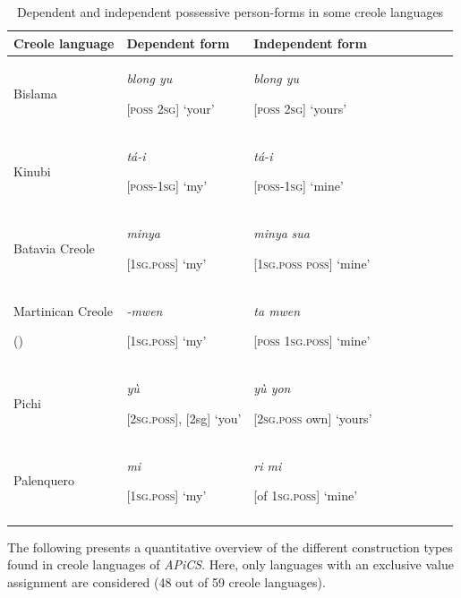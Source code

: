 \documentclass[output=paper]{langsci/langscibook}
\begin{document}
\begin{table}
\begin{tabularx}{\textwidth}{XXX}
\lsptoprule

\bfseries Creole language & \bfseries Dependent form & \bfseries Independent form\\
\midrule
Bislama

\citep{Meyerhoff2013} & \textit{blong yu}{\textit{~}}

[\textsc{poss} \textsc{2sg}] `your' & \textit{blong yu}{\textit{~}} {\textit{~ ~ ~ ~ ~ ~ ~ ~ ~ ~ ~ ~ ~}}

[\textsc{poss} \textsc{2sg}] { `}yours'\\
Kinubi

\citep{Luffin2013} & \textit{tá-i}

[\textsc{poss-1sg}] `my' & \textit{tá-i}

[\textsc{poss-1sg}] `mine'\\
Batavia Creole 

\citep{Maurer2013} & \textit{minya} 

[\textsc{1sg.poss}] `my' & \textit{minya}\textbf{ }\textit{sua}\textbf{ }

[\textsc{1sg.poss} \textsc{poss}] `mine'\\
Martinican Creole

(\citealt{ColotLudwig2013}) & \textit{{}-mwen}

[\textsc{1sg.poss}] `my' & \textit{ta mwen}

[\textsc{poss} \textsc{1sg.poss}] `mine'\\
Pichi

\citep{Yakpo2013} & \textit{yù} {\textit{~}}

[\textsc{2sg.poss}], [2sg] `you' & \textit{yù yon}

[\textsc{2sg.poss} own] `yours'\\
Palenquero

\citep{Schwegler2013} & \textit{mi}

[\textsc{1sg.poss}] `my' & \textit{ri mi}

[of \textsc{1sg.poss}] `mine'\\
\lspbottomrule
\end{tabularx}

\caption{Dependent and independent possessive person-forms in some creole languages}
\label{tab:4}
\end{table}

The following presents a quantitative overview of the different construction types found in creole languages of \textit{APiCS}. Here, only languages with an exclusive value assignment are considered (48 out of 59 creole languages).
\end{document}
